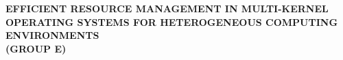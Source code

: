 \documentclass[16pt,a4paper]{article}
\begin{document}
\begin{titlepage}
  \centering


  \vspace{2cm}  %

  \large{\textbf{EFFICIENT RESOURCE MANAGEMENT IN MULTI-KERNEL OPERATING SYSTEMS FOR HETEROGENEOUS COMPUTING ENVIRONMENTS}}\\
  
  \large{\textbf{(GROUP E)}}

  \date{}  %
\end{titlepage}
\clearpage
\tableofcontents
\newpage
\end{document}

